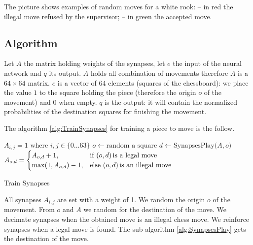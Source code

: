 \documentclass[a4paper,10pt]{article}
\begin{document}
\chessboard[
  setpieces={Re4},
  pgfstyle=straightmove,
  arrow=stealth,
  linewidth=.25ex,
  padding=1ex,
  pgfstyle=straightmove,
  shortenstart=1ex,
  showmover=true,
  color=red!75!white,
  markmoves={e4-g5},
  color=green!75!white,
  markmoves={e4-g4}
]

The picture shows examples of random moves for a white rook: -- in red the
illegal move refused by the supervisor; -- in green the accepted move.

\subsection{Algorithm}

Let $A$ the matrix holding weights of the synapses, let $e$ the input of the
neural network and $q$ its output. $A$ holds all combination of movements
therefore $A$ is a $64 \times 64$ matrix. $e$ is a vector of $64$ elements
(squares of the chessboard): we place the value $1$ to the square holding the
piece (therefore the origin $o$ of the movement) and $0$ when empty. $q$ is the
output: it will contain the normalized probabilities of the destination squares
for finishing the movement.

\newpage
The algorithm \ref{alg:TrainSynapses} for training a piece to move is the
follow.

\begin{algorithm}
  \label{alg:TrainSynapses}
  \DontPrintSemicolon
  $A_{i,j} = 1 \text{ where } i,j \in \{0 \dotsc 63\}$\;
  {
    $o \gets \text{random a square}$\;
    $d \gets \text{SynapsesPlay(}A,o\text{)}$\;
    $A_{o,d} =
    \begin{cases}
      A_{o,d} + 1,& \text{if } (o, d) \text{\,is a legal move} \\
      \max(1,A_{o,d}) - 1,& \text{else } (o, d) \text{\,is an illegal move}
    \end{cases}
    $\;
  }
  \caption{Train Synapses}
\end{algorithm}

All synapses $A_{i,j}$ are set with a weight of 1. We random the origin $o$ of
the movement. From $o$ and $A$ we random for the destination of the move.  We
decimate synapses when the obtained move is an illegal chess move.  We reinforce
synapses when a legal move is found. The sub algorithm \ref{alg:SynapsesPlay}
gets the destination of the move.
\end{document}
